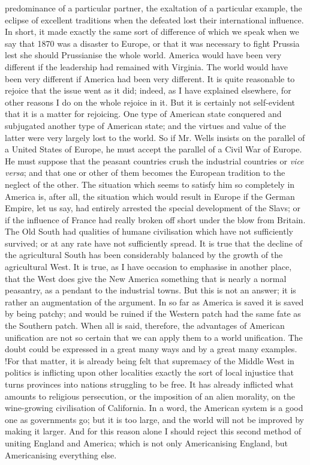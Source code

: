 \documentclass{book}
\begin{document}
predominance of a particular partner, the exaltation of a particular example, the eclipse of excellent traditions when the defeated lost their international influence. In short, it made exactly the same sort of difference of which we speak when we say that 1870 was a disaster to Europe, or that it was necessary to fight Prussia lest she should Prussianise the whole world. America would have been very different if the leadership had remained with Virginia. The world would have been very different if America had been very different. It is quite reasonable to rejoice that the issue went as it did; indeed, as I have explained elsewhere, for other reasons I do on the whole rejoice in it. But it is certainly not self-evident that it is a matter for rejoicing. One type of American state conquered and subjugated another type of American state; and the virtues and value of the latter were very largely lost to the world. So if Mr. Wells insists on the parallel of a United States of Europe, he must accept the parallel of a Civil War of Europe. He must suppose that the peasant countries crush the industrial countries or \emph{vice versa}; and that one or other of them becomes the European tradition to the neglect of the other. The situation which seems to satisfy him so completely in America is, after all, the situation which would result in Europe if the German Empire, let us say, had entirely arrested the special development of the Slavs; or if the influence of France had really broken off short under the blow from Britain. The Old South had qualities of humane civilisation which have not sufficiently survived; or at any rate have not sufficiently spread. It is true that the decline of the agricultural South has been considerably balanced by the growth of the agricultural West. It is true, as I have occasion to emphasise in another place, that the West does give the New America something that is nearly a normal peasantry, as a pendant to the industrial towns. But this is not an answer; it is rather an augmentation of the argument. In so far as America is saved it is saved by being patchy; and would be ruined if the Western patch had the same fate as the Southern patch. When all is said, therefore, the advantages of American unification are not so certain that we can apply them to a world unification. The doubt could be expressed in a great many ways and by a great many examples. !For that matter, it is already being felt that supremacy of the Middle West in politics is inflicting upon other localities exactly the sort of local injustice that turns provinces into nations struggling to be free. It has already inflicted what amounts to religious persecution, or the imposition of an alien morality, on the wine-growing civilisation of California. In a word, the American system is a good one as governments go; but it is too large, and the world will not be improved by making it larger. And for this reason alone I should reject this second method of uniting England and America; which is not only Americanising England, but Americanising everything else.
\end{document}
